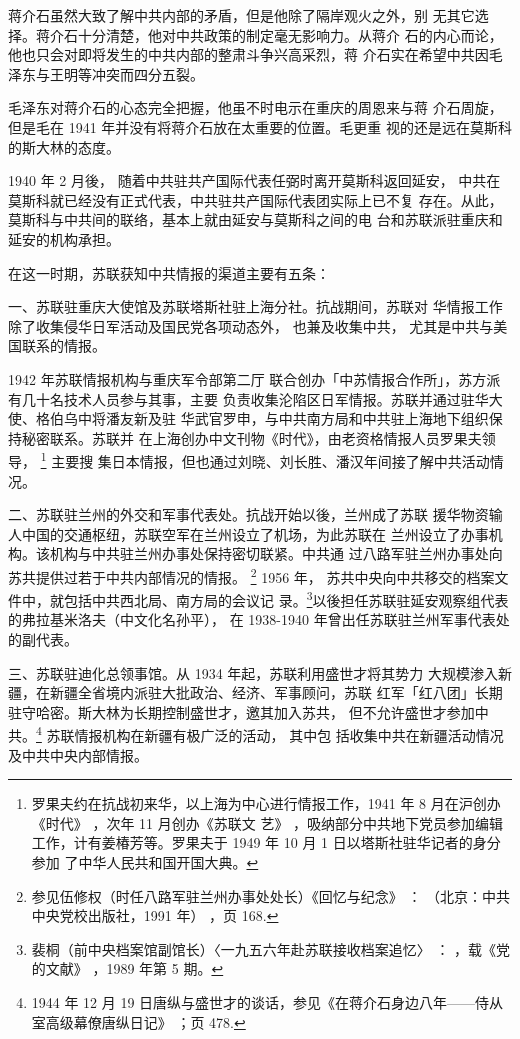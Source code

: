 蒋介石虽然大致了解中共内部的矛盾，但是他除了隔岸观火之外，别
无其它选择。蒋介石十分清楚，他对中共政策的制定毫无影响力。从蒋介
石的内心而论，他也只会对即将发生的中共内部的整肃斗争兴高采烈，蒋
介石实在希望中共因毛泽东与王明等冲突而四分五裂。

毛泽东对蒋介石的心态完全把握，他虽不时电示在重庆的周恩来与蒋
介石周旋，但是毛在 1941 年并没有将蒋介石放在太重要的位置。毛更重
视的还是远在莫斯科的斯大林的态度。

1940 年 2 月後，
随着中共驻共产国际代表任弼时离开莫斯科返回延安，
中共在莫斯科就已经没有正式代表，中共驻共产国际代表团实际上已不复
存在。从此，莫斯科与中共间的联络，基本上就由延安与莫斯科之间的电
台和苏联派驻重庆和延安的机构承担。

在这一时期，苏联获知中共情报的渠道主要有五条：

一、苏联驻重庆大使馆及苏联塔斯社驻上海分社。抗战期间，苏联对
华情报工作除了收集侵华日军活动及国民党各项动态外，
也兼及收集中共，
尤其是中共与美国联系的情报。

1942 年苏联情报机构与重庆军令部第二厅
联合创办「中苏情报合作所」，苏方派有几十名技术人员参与其事，主要
负责收集沦陷区日军情报。苏联并通过驻华大使、格伯乌中将潘友新及驻
华武官罗申，与中共南方局和中共驻上海地下组织保持秘密联系。苏联并
在上海创办中文刊物《时代》，由老资格情报人员罗果夫领导，
\footnote{罗果夫约在抗战初来华，以上海为中心进行情报工作，1941 年 8 月在沪创办《时代》
，次年 11 月创办《苏联文
艺》
，吸纳部分中共地下党员参加编辑工作，计有姜椿芳等。罗果夫于 1949 年 10 月 1 日以塔斯社驻华记者的身分参加
了中华人民共和国开国大典。
} 主要搜
集日本情报，但也通过刘晓、刘长胜、潘汉年间接了解中共活动情况。

二、苏联驻兰州的外交和军事代表处。抗战开始以後，兰州成了苏联
援华物资输人中国的交通枢纽，苏联空军在兰州设立了机场，为此苏联在
兰州设立了办事机构。该机构与中共驻兰州办事处保持密切联紧。中共通
过八路军驻兰州办事处向苏共提供过若于中共内部情况的情报。
\footnote{参见伍修权（时任八路军驻兰州办事处处长）《回忆与纪念》
：
（北京：中共中央党校出版社，1991 年）
，页 168. } 1956 年，
苏共中央向中共移交的档案文件中，就包括中共西北局、南方局的会议记
录。\footnote{裴桐（前中央档案馆副馆长）〈一九五六年赴苏联接收档案追忆〉
：
，载《党的文献》
，1989 年第 5 期。}以後担任苏联驻延安观察组代表的弗拉基米洛夫（中文化名孙平），
在 1938-1940 年曾出任苏联驻兰州军事代表处的副代表。

三、苏联驻迪化总领事馆。从 1934 年起，苏联利用盛世才将其势力
大规模渗入新疆，在新疆全省境内派驻大批政治、经济、军事顾问，苏联
红军「红八团」长期驻守哈密。斯大林为长期控制盛世才，邀其加入苏共，
但不允许盛世才参加中共。\footnote{1944 年 12 月 19 日唐纵与盛世才的谈话，参见《在蒋介石身边八年——侍从室高级幕僚唐纵日记》
；页 478. 
} 苏联情报机构在新疆有极广泛的活动，
其中包
括收集中共在新疆活动情况及中共中央内部情报。

